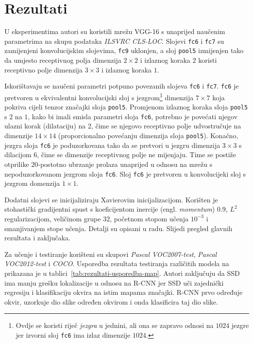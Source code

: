 \documentclass[utf8, diplomski, numeric, lmodern]{fer}
\begin{document}
\chapter{Rezultati} \label{chap:rezultati}

U eksperimentima autori su koristili mrežu VGG-16 s unaprijed naučenim parametrima na skupu podataka \emph{ILSVRC CLS-LOC}. Slojevi \texttt{fc6} i \texttt{fc7} su zamijenjeni konvolucijskim slojevima, \texttt{fc9} uklonjen, a sloj \texttt{pool5} izmijenjen tako da umjesto receptivnog polja dimenzija $2\times2$ i izlaznog koraka $2$ koristi receptivno polje dimenzija $3\times 3$ i izlaznog koraka $1$. 

Iskorištavaju se naučeni parametri potpuno povezanih slojeva \texttt{fc6} i \texttt{fc7}. \texttt{fc6} je pretvoren u ekvivalentni konvolucijski sloj s jezgrom\footnote{Ovdje se koristi riječ \emph{jezgra} u jednini, ali ona se zapravo odnosi na $1024$ jezgre jer izvorni sloj \texttt{fc6} ima izlaz dimenzije $1024$.} dimenzija $7\times 7$ koja pokriva cijeli tenzor značajki sloja \texttt{pool5}. Promjenom izlaznog koraka sloja \texttt{pool5} s $2$ na $1$, kako bi imali smisla parametri sloja \texttt{fc6}, potrebno je povećati njegov ulazni korak (dilataciju) na 2, čime se njegovo receptivno polje udvostručuje na dimenzije $14\times 14$ (proporcionalno povećanju dimenzija sloja \texttt{pool5}). Konačno, jezgra sloja \texttt{fc6} je poduzorkovana tako da se pretvori u jezgru dimenzija $3\times 3$ s dilacijom 6, čime se dimenzije receptivnog polje ne mijenjaju. Time se postiže otprilike $20$-postotno ubrzanje prolaza unaprijed u odnosu na mrežu s nepoduzorkovanom jezgrom sloja \texttt{fc6}. Sloj \texttt{fc6} je pretvoren u konvolucijeki sloj s jezgrom domenzija $1\times 1$.

Dodatni slojevi se inicijaliziraju Xavierovim inicijalizacijom. Korišten je stohastički gradijentni spust s koeficijentom inercije (engl. \emph{momentum}) $0.9$, $L^2$ regularizacijom, veličinom grupe $32$, početnom stopom učenja $10^{-3}$ i smanjivanjem stope učenja. Detalji su opisani u radu. Slijedi pregled glavnih rezultata i zaključaka.

Za učenje i testiranje korišteni su skupovi \emph{Pascal VOC2007-test}, \emph{Pascal VOC2012-test} i \emph{COCO}. Usporedba rezultata testiranja različitih modela na prikazana je u tablici~\ref{tab:rezultati-usporedba-map}. Autori zaključuju da SSD ima manju grešku lokalizacije u odnosu na R-CNN jer SSD uči zajednički regresiju i klasifikaciju okvira na istim mapama značajki. R-CNN prvo određuje okvir, uzorkuje dio slike određen okvirom i onda klasificira taj dio slike. 
\end{document}
